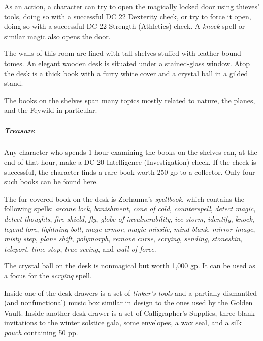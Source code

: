 \documentclass[10pt,a4paper,twoside,bg=print,twocolumn,openany,nodeprecatedcode]{dndbook}
\begin{document}
As an action, a character can try to open the magically locked door using thieves' tools, doing so with a successful DC 22 Dexterity check, or try to force it open, doing so with a successful DC 22 Strength (Athletics) check. A \textit{knock} spell or similar magic also opens the door.

\begin{DndReadAloud}{}
The walls of this room are lined with tall shelves stuffed with leather-bound tomes. An elegant wooden desk is situated under a stained-glass window. Atop the desk is a thick book with a furry white cover and a crystal ball in a gilded stand.

\end{DndReadAloud}

The books on the shelves span many topics mostly related to nature, the planes, and the Feywild in particular.

\subparagraph{Treasure}
Any character who spends 1 hour examining the books on the shelves can, at the end of that hour, make a DC 20 Intelligence (Investigation) check. If the check is successful, the character finds a rare book worth 250 gp to a collector. Only four such books can be found here.

The fur-covered book on the desk is Zorhanna's \textit{spellbook}, which contains the following spells: \textit{arcane lock}, \textit{banishment}, \textit{cone of cold}, \textit{counterspell}, \textit{detect magic}, \textit{detect thoughts}, \textit{fire shield}, \textit{fly}, \textit{globe of invulnerability}, \textit{ice storm}, \textit{identify}, \textit{knock}, \textit{legend lore}, \textit{lightning bolt}, \textit{mage armor}, \textit{magic missile}, \textit{mind blank}, \textit{mirror image}, \textit{misty step}, \textit{plane shift}, \textit{polymorph}, \textit{remove curse}, \textit{scrying}, \textit{sending}, \textit{stoneskin}, \textit{teleport}, \textit{time stop}, \textit{true seeing}, and \textit{wall of force}.

The crystal ball on the desk is nonmagical but worth 1,000 gp. It can be used as a focus for the \textit{scrying} spell.

Inside one of the desk drawers is a set of \textit{tinker's tools} and a partially dismantled (and nonfunctional) music box similar in design to the ones used by the Golden Vault. Inside another desk drawer is a set of Calligrapher's Supplies, three blank invitations to the winter solstice gala, some envelopes, a wax seal, and a silk \textit{pouch} containing 50 pp.
\end{document}
